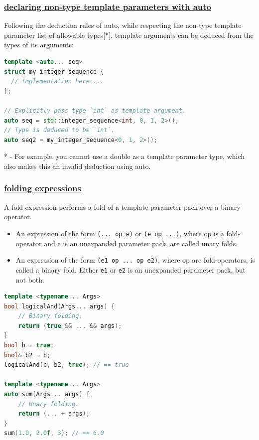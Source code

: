\subsubsection{\href{https://github.com/AnthonyCalandra/modern-cpp-features/tree/master\#declaring-non-type-template-parameters-with-auto}
                    {declaring non-type template parameters with auto}}
Following the deduction rules of auto, while respecting the non-type 
template parameter list of allowable types[*], template arguments can be 
deduced from the types of its arguments:
\begin{lstlisting}[language=C++]
template <auto... seq>
struct my_integer_sequence {
  // Implementation here ...
};

// Explicitly pass type `int` as template argument.
auto seq = std::integer_sequence<int, 0, 1, 2>();
// Type is deduced to be `int`.
auto seq2 = my_integer_sequence<0, 1, 2>();
\end{lstlisting}

* - For example, you cannot use a double as a template parameter type, which also makes this an invalid deduction using auto.
\subsubsection{\href{https://github.com/AnthonyCalandra/modern-cpp-features/tree/master\#folding-expressions}
                    {folding expressions}}
A fold expression performs a fold of a template parameter pack over a binary operator.
\begin{itemize}
    \item An expression of the form \texttt{(... op e)} or \texttt{(e op ...)}, 
          where op is a fold-operator and e is an unexpanded parameter 
          pack, are called unary folds.
    \item An expression of the form \texttt{(e1 op ... op e2)}, where op 
          are fold-operators, is called a binary fold. Either \texttt{e1} 
          or \texttt{e2} is an unexpanded parameter pack, but not both.
\end{itemize}
\begin{lstlisting}[language=C++]
template <typename... Args>
bool logicalAnd(Args... args) {
    // Binary folding.
    return (true && ... && args);
}
bool b = true;
bool& b2 = b;
logicalAnd(b, b2, true); // == true

template <typename... Args>
auto sum(Args... args) {
    // Unary folding.
    return (... + args);
}
sum(1.0, 2.0f, 3); // == 6.0
\end{lstlisting}

